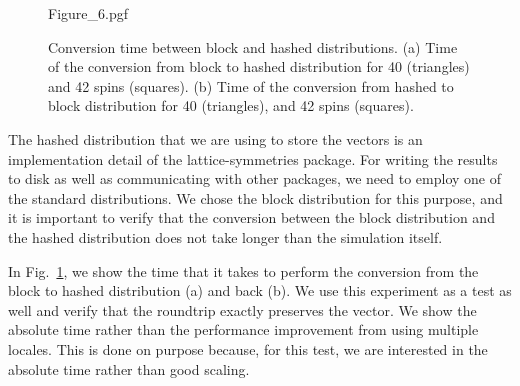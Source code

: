 \begin{figure}
  \centering
  {Figure_6.pgf}
  \caption{Conversion time between block and hashed distributions. (a) Time of the conversion from block to hashed distribution for 40 (triangles) and 42 spins (squares). (b) Time of the conversion from hashed to block distribution for 40 (triangles), and 42 spins (squares).}
  \label{fig:ls23:blockHashed}
\end{figure}



The hashed distribution that we are using to store the vectors is an implementation detail of the lattice-symmetries package. For writing the results to disk as well as communicating with other packages, we need to employ one of the standard distributions. We chose the block distribution for this purpose, and it is important to verify that the conversion between the block distribution and the hashed distribution does not take longer than the simulation itself.

In Fig.~\ref{fig:ls23:blockHashed}, we show the time that it takes to perform the conversion from the block to hashed distribution (a) and back (b). We use this experiment as a test as well and verify that the roundtrip exactly preserves the vector. We show the absolute time rather than the performance improvement from using multiple locales. This is done on purpose because, for this test, we are interested in the absolute time rather than good scaling.

